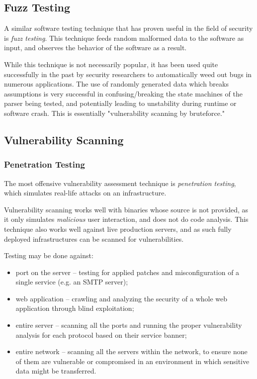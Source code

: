 \documentclass[a4paper,12pt]{article}
\begin{document}
\subsection{Fuzz Testing}
	
	A similar software testing technique that has proven useful in the field of security is \textit{fuzz testing}. This technique feeds random malformed data to the software as input, and observes the behavior of the software as a result.
	
	While this technique is not necessarily popular, it has been used quite successfully in the past by security researchers to automatically weed out bugs in numerous applications.\cite{mzalewski15} The use of randomly generated data which breaks assumptions is very successful in confusing/breaking the state machines of the parser being tested, and potentially leading to unstability during runtime or software crash. This is essentially "vulnerability scanning by bruteforce."
	
\subsection{Vulnerability Scanning}
	
\subsubsection{Penetration Testing}
	
	The most offensive vulnerability assessment technique is \textit{penetration testing}, which simulates real-life attacks on an infrastructure.
	
	Vulnerability scanning works well with binaries whose source is not provided, as it only simulates \textit{malicious} user interaction, and does not do code analysis. This technique also works well against live production servers, and as such fully deployed infrastructures can be scanned for vulnerabilities.
	
	\noindent Testing may be done against:
	
	\begin{itemize}
		\item port on the server -- testing for applied patches and misconfiguration of a single service (e.g. an SMTP server);
		\item web application -- crawling and analyzing the security of a whole web application through blind exploitation;
		\item entire server -- scanning all the ports and running the proper vulnerability analysis for each protocol based on their service banner;
		\item entire network -- scanning all the servers within the network, to ensure none of them are vulnerable or compromised in an environment in which sensitive data might be transferred.
	\end{itemize}
	
\end{document}
